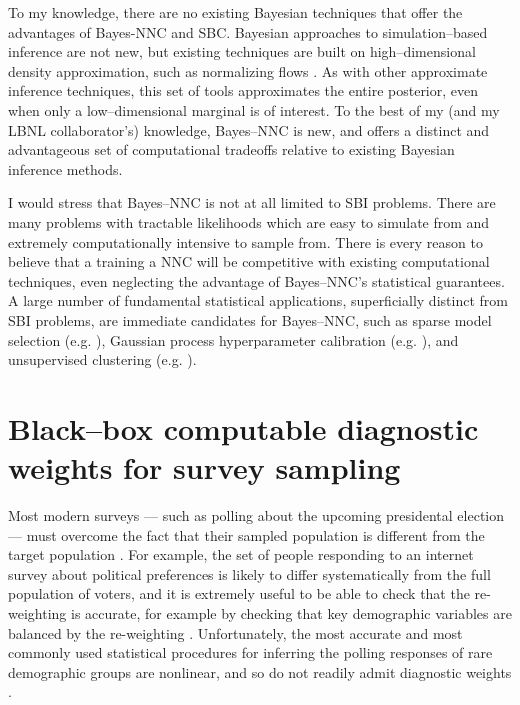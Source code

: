 To my knowledge, there are no existing Bayesian techniques that offer the
advantages of Bayes-NNC and SBC.  Bayesian approaches to simulation--based
inference are not new, but existing techniques are built on high--dimensional
density approximation, such as normalizing flows
\citep{cranmer:2020:frontierofsimulation,papamakarios:2021:normalizing}.  As
with other approximate inference techniques, this set of tools approximates the
entire posterior, even when only a low--dimensional marginal is of interest.  To
the best of my (and my LBNL collaborator's) knowledge, Bayes--NNC is new, and
offers a distinct and advantageous set of computational tradeoffs relative to
existing Bayesian inference methods.  

I would stress that Bayes--NNC is not at all limited to SBI problems. There are
many problems with tractable likelihoods which are easy to simulate from and
extremely computationally intensive to sample from.  There is every reason to
believe that a training a NNC will be competitive with existing computational
techniques, even neglecting the advantage of Bayes--NNC's statistical
guarantees.  A large number of fundamental statistical applications,
superficially distinct from SBI problems, are immediate candidates for
Bayes--NNC, such as sparse model selection (e.g.
\citep{rovckova:2018:spikeandslablasso}), Gaussian process hyperparameter
calibration (e.g. \citep{hensman:2015:gpclassificationscalable}), and
unsupervised clustering (e.g. \citet{mcauliffe:2006:dpeb}).



\section*{Black--box computable diagnostic weights for survey sampling}

Most modern surveys --- such as polling about the upcoming presidental election
--- must overcome the fact that their sampled population is different from the
target population \citep{gelman:2007:surveystruggles}.  For example, the set of
people responding to an internet survey about political preferences is likely to
differ systematically from the full population of voters, and it is extremely
useful to be able to check that the re-weighting is accurate, for example by
checking that key demographic variables are balanced by the re-weighting
\citep{li:2018:balancingcovariates,benmichael:2021:multilevel}. Unfortunately,
the most accurate and most commonly used statistical procedures for inferring
the polling responses of rare demographic groups are nonlinear, and so do not
readily admit diagnostic weights
\citep{gelman:1997:poststratification,gelman:2007:surveystruggles}. 

